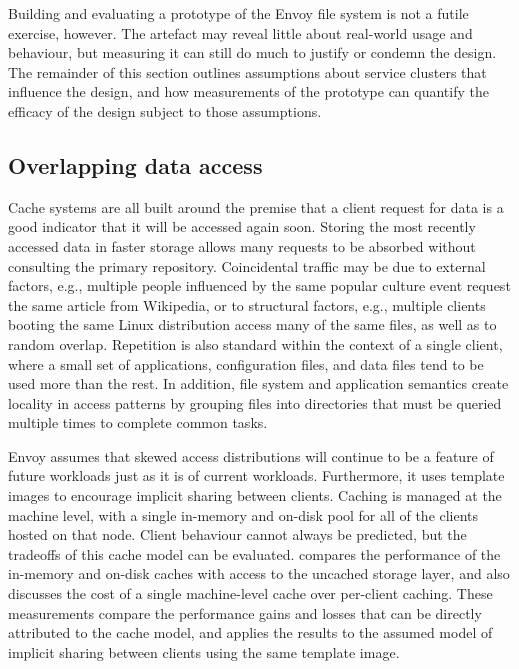 Building and evaluating a prototype of the Envoy file system is not a futile exercise, however. The artefact may reveal little about real-world usage and behaviour, but measuring it can still do much to justify or condemn the design. The remainder of this section outlines assumptions about service clusters that influence the design, and how measurements of the prototype can quantify the efficacy of the design subject to those assumptions.

\subsection{Overlapping data access}

Cache systems are all built around the premise that a client request for data is a good indicator that it will be accessed again soon. Storing the most recently accessed data in faster storage allows many requests to be absorbed without consulting the primary repository. Coincidental traffic may be due to external factors, e.g., multiple people influenced by the same popular culture event request the same article from Wikipedia, or to structural factors, e.g., multiple clients booting the same Linux distribution access many of the same files, as well as to random overlap. Repetition is also standard within the context of a single client, where a small set of applications, configuration files, and data files tend to be used more than the rest. In addition, file system and application semantics create locality in access patterns by grouping files into directories that must be queried multiple times to complete common tasks.

Envoy assumes that skewed access distributions will continue to be a feature of future workloads just as it is of current workloads. Furthermore, it uses template images to encourage implicit sharing between clients. Caching is managed at the machine level, with a single in-memory and on-disk pool for all of the clients hosted on that node. Client behaviour cannot always be predicted, but the tradeoffs of this cache model can be evaluated.  compares the performance of the in-memory and on-disk caches with access to the uncached storage layer, and also discusses the cost of a single machine-level cache over per-client caching. These measurements compare the performance gains and losses that can be directly attributed to the cache model, and  applies the results to the assumed model of implicit sharing between clients using the same template image.


